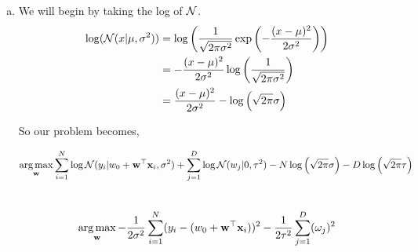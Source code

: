 \documentclass[12pt,letterpaper,fleqn]{hmcpset}
\begin{document}
\vspace{15mm}

\begin{enumerate}[(a)]
    \item 
        We will begin by taking the log of ${\cal N}$.
            \begin{align*}
               \log({\cal N}(x|\mu,\sigma^2)) &= \log\left(\frac{1}{\sqrt{2\pi\sigma^2}}\exp\left(-\frac{(x-\mu)^2}{2\sigma^2}\right)\right)\\
               &=-\frac{(x-\mu)^2}{2\sigma^2} \log\left( \frac{1}{\sqrt{2\pi\sigma^2}} \right)\\
               &= \frac{(x-\mu)^2}{2\sigma^2} - \log \left( \sqrt{2 \pi }\sigma \right)
            \end{align*}
            
            So our problem becomes,
                
                $$\operatorname*{arg\,max}_{\bf w} \sum_{i=1}^N \log{\cal N}(y_i | w_0 + {\bf w}^\top{\bf x}_i, \sigma^2) + \sum_{j=1}^D \log{\cal N}(w_j | 0, \tau^2) - N\log \left( \sqrt{2 \pi }\sigma \right) - D\log \left( \sqrt{2 \pi }\tau \right) $$ \\
                $$\operatorname*{arg\,max}_{\bf w} -\frac{1}{2\sigma^2}\sum_{i=1}^N (y_i-(w_0 + {\bf w}^\top {\bf x}_i))^2 - \frac{1}{2 \tau^2 } \sum_{j=1}^D (\omega_j)^2$$
            

\end{enumerate}
\end{document}
